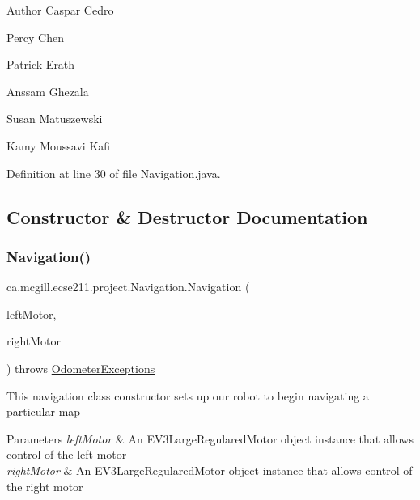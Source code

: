 \begin{DoxyAuthor}{Author}
Caspar Cedro 

Percy Chen 

Patrick Erath 

Anssam Ghezala 

Susan Matuszewski 

Kamy Moussavi Kafi 
\end{DoxyAuthor}


Definition at line 30 of file Navigation.\+java.



\subsection{Constructor \& Destructor Documentation}
\mbox{\label{classca_1_1mcgill_1_1ecse211_1_1project_1_1_navigation_aaee14b67c392ddd951e3ce21224c3e56}} 
\subsubsection{\texorpdfstring{Navigation()}{Navigation()}}
{\footnotesize\ttfamily ca.\+mcgill.\+ecse211.\+project.\+Navigation.\+Navigation (\begin{DoxyParamCaption}\item[{E\+V3\+Large\+Regulated\+Motor}]{left\+Motor,  }\item[{E\+V3\+Large\+Regulated\+Motor}]{right\+Motor }\end{DoxyParamCaption}) throws \hyperlink{classca_1_1mcgill_1_1ecse211_1_1odometer_1_1_odometer_exceptions}{Odometer\+Exceptions}}

This navigation class constructor sets up our robot to begin navigating a particular map


\begin{DoxyParams}{Parameters}
{\em left\+Motor} & An E\+V3\+Large\+Regulared\+Motor object instance that allows control of the left motor \\
\hline
{\em right\+Motor} & An E\+V3\+Large\+Regulared\+Motor object instance that allows control of the right motor \\
\hline
\end{DoxyParams}


